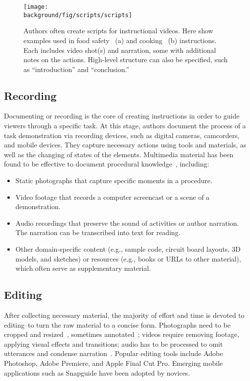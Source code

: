 \begin{figure*}[th!]
  \centering
  \texttt{[image: \\background/fig/scripts/scripts]}
  \caption{Authors often create scripts for instructional videos. Here show examples used in food safety~\protect\cite{WisconsinFoodSafetyScript} (a) and cooking~\protect\cite{SouthernIllinoisScript} (b) instructions.
  Each includes video shot(s) and narration, some with additional notes on the actions. High-level structure can also be specified, such as ``introduction'' and ``conclusion.''}
  \label{fig:background_scripts}
\end{figure*}

\subsection{Recording}
Documenting or recording is the core of creating instructions in order to guide viewers through a specific task. At this stage, authors document the process of a task demonstration via recording devices, such as digital cameras, camcorders, and mobile devices. They capture necessary actions using tools and materials, as well as the changing of states of the elements.
%
Multimedia material has been found to be effective to document procedural knowledge~\cite{Kuznetsov:2010:REA:1868914.1868950,Wakkary:2015:TAH:2702123.2702550,Moreno2007}, including:

\begin{itemize}
  \item Static photographs that capture specific moments in a procedure.
  \item Video footage that records a computer screencast or a scene of a demonstration.
  \item Audio recordings that preserve the sound of activities or author narration. The narration can be transcribed into text for reading.
  \item Other domain-specific content (e.g., sample code, circuit board layouts, 3D models, and sketches) or resources (e.g., books or URLs to other material), which often serve as supplementary material.
\end{itemize}

\subsection{Editing}
After collecting necessary material, the majority of effort and time is devoted to editing--to turn the raw material to a concise form.
Photographs need to be cropped and resized~\cite{Tseng:2014:PVP:2598510.2598540}, sometimes annotated~\cite{Torrey:2007he}; videos require removing footage, applying visual effects and transitions; audio has to be processed to omit utterances and condense narration~\cite{Chi:2013:DGC:2501988.2502052}. Popular editing tools include Adobe Photoshop, Adobe Premiere, and Apple Final Cut Pro. Emerging mobile applications such as Snapguide have been adopted by novices.

